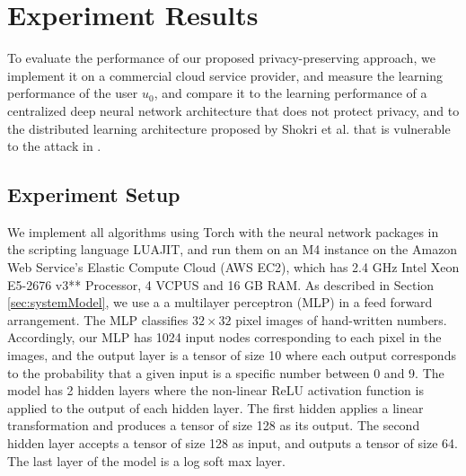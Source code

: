 \documentclass[conference]{IEEEtran}
\begin{document}
\section{Experiment Results}

To evaluate the performance of our proposed privacy-preserving approach, we implement it on a commercial cloud service provider, and
measure the learning performance of the user $u_0$, and compare it to the learning performance of a centralized deep neural network
architecture that does not protect privacy, and to the distributed learning architecture proposed by Shokri et al. 
\cite{shokri2015privacy} that is vulnerable to the attack in \cite{hitaj2017deep}.

\subsection{Experiment Setup}
We implement all algorithms using Torch with the neural network packages in the scripting language LUAJIT, and run them on an M4
instance on the Amazon Web Service's Elastic Compute Cloud (AWS EC2), which has
2.4 GHz Intel Xeon E5-2676 v3** Processor, 4 VCPUS and 16 GB RAM.
As described in Section \ref{sec:systemModel}, we use a 
a multilayer perceptron (MLP) in a feed forward arrangement. The MLP classifies $32\times 32$ pixel images of hand-written numbers. 
Accordingly, our MLP has 1024 input nodes corresponding to each
pixel in the images, and the output layer is a tensor of size 10 where each output corresponds to the probability
that a given input is a specific number
between 0 and 9.  The model has 2 hidden layers where the non-linear ReLU activation function is applied to the
output of each hidden layer.  The first hidden applies a linear transformation
and produces a tensor of size 128 as its output. The second hidden layer accepts a tensor of size 128 as input, and outputs a tensor of
size 64. The last layer of the model is a log soft max layer. 
\end{document}
